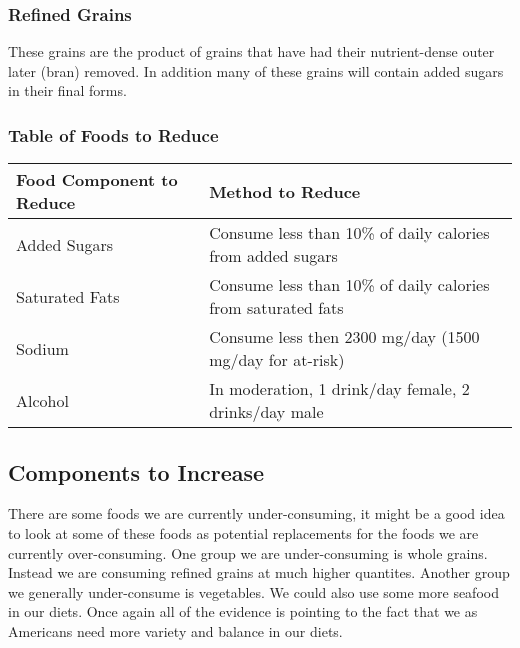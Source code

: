 \documentclass[letterpaper, 11pt]{article}
\begin{document}
\subsubsection{Refined Grains}
\label{sec:org4add34e}
These grains are the product of grains that have had their nutrient-dense outer later (bran) removed. In addition many of these grains will contain added sugars in their final forms.\\
\subsubsection{Table of Foods to Reduce}
\label{sec:orgc822727}
\begin{center}
\begin{tabular}{ll}
Food Component to Reduce & Method to Reduce\\
\hline
Added Sugars & Consume less than 10\% of daily calories from added sugars\\
Saturated Fats & Consume less than 10\% of daily calories from saturated fats\\
Sodium & Consume less then 2300 mg/day (1500 mg/day for at-risk)\\
Alcohol & In moderation,  1 drink/day female,  2 drinks/day male\\
\end{tabular}
\end{center}
\subsection{Components to Increase}
\label{sec:orgece8506}
There are some foods we are currently under-consuming, it might be a good idea to look at some of these foods as potential replacements for the foods we are currently over-consuming. One group we are under-consuming is whole grains. Instead we are consuming refined grains at much higher quantites. Another group we generally under-consume is vegetables. We could also use some more seafood in our diets. Once again all of the evidence is pointing to the fact that we as Americans need more variety and balance in our diets.\\
\end{document}
